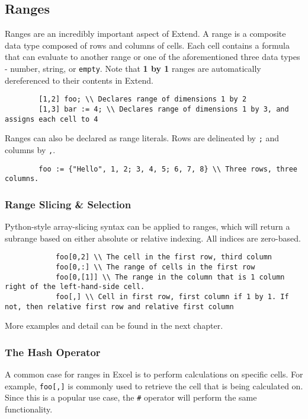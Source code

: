 	\subsection{Ranges}
	Ranges are an incredibly important aspect of Extend. A range is a composite data type composed of rows and columns of cells.
	Each cell contains a formula that can evaluate to another range or one of the aforementioned three data types - number, string, or \texttt{empty}. Note that \textbf{1 by 1} ranges are automatically dereferenced to their contents in Extend.

	\begin{lstlisting}
		[1,2] foo; \\ Declares range of dimensions 1 by 2
		[1,3] bar := 4; \\ Declares range of dimensions 1 by 3, and assigns each cell to 4
	\end{lstlisting}

	\medskip \noindent
	Ranges can also be declared as range literals. Rows are delineated by \texttt{;} and columns by \texttt{,}.

	\begin{lstlisting}
		foo := {"Hello", 1, 2; 3, 4, 5; 6, 7, 8} \\ Three rows, three columns.
	\end{lstlisting}

		\subsubsection{Range Slicing \& Selection}
		Python-style array-slicing syntax can be applied to ranges, which will return a subrange based on either absolute or relative indexing. All indices are zero-based.

		\begin{lstlisting}
			foo[0,2] \\ The cell in the first row, third column
			foo[0,:] \\ The range of cells in the first row
			foo[0,[1]] \\ The range in the column that is 1 column right of the left-hand-side cell.
			foo[,] \\ Cell in first row, first column if 1 by 1. If not, then relative first row and relative first column
		\end{lstlisting}

		\medskip \noindent
		More examples and detail can be found in the next chapter.

		\subsubsection{The Hash Operator}
		A common case for ranges in Excel is to perform calculations on specific cells. For example, \texttt{foo[,]} is commonly used to retrieve the cell that is being calculated on.
		Since this is a popular use case, the \texttt{\#} operator will perform the same functionality.

